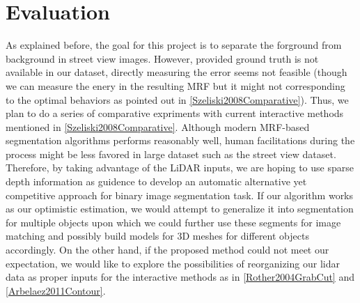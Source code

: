 \documentclass{article} %
\begin{document}
\section{Evaluation}
As explained before, the goal for this project is to separate the forground from background in street view images. However, provided ground truth is not available in our dataset, directly measuring the error seems not feasible (though we can measure the enery in the resulting MRF but it might not corresponding to the optimal behaviors as pointed out in \ref{Szeliski2008Comparative}). Thus, we plan to do a series of comparative expriments with current interactive methods mentioned in \ref{Szeliski2008Comparative}. Although modern MRF-based segmentation algorithms performs reasonably well, human facilitations during the process might be less favored in large dataset such as the street view dataset. Therefore,  by taking advantage of the LiDAR inputs, we are hoping to use sparse depth information as guidence to develop an automatic alternative yet competitive approach for binary image segmentation task. If our algorithm works as our optimistic estimation, we would attempt to generalize it into segmentation for multiple objects upon which we could further use these segments for image matching and possibly build models for 3D meshes for different objects accordingly. On the other hand, if the proposed method could not meet our expectation, we would like to explore the possibilities of reorganizing our lidar data as proper inputs for the interactive methods as in \ref{Rother2004GrabCut} and \ref{Arbelaez2011Contour}.



\end{document}
